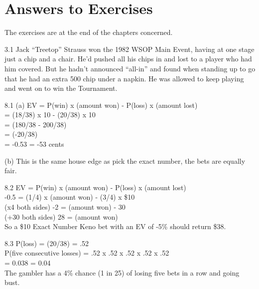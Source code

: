 \chapter{Answers to Exercises}

The exercises are at the end of the chapters concerned.

3.1 Jack ``Treetop'' Strauss won the 1982 WSOP Main Event,
having at one stage just a chip and a chair. He'd
pushed all his chips in and lost to a player who had him
covered. But he hadn't announced ``all-in'' and found when standing up
to go that he had an extra 500 chip under a napkin. He was allowed to
keep playing and went on to win the Tournament.

8.1 (a) EV = P(win) x (amount won) - P(loss) x (amount lost) \\
= (18/38) x 10 - (20/38) x 10 \\
= (180/38 - 200/38) \\
= (-20/38) \\
= -0.53 = -53 cents

(b) This is the same house edge as pick the exact number, the bets are
equally fair.

8.2 EV = P(win) x (amount won) - P(loss) x (amount lost) \\
-0.5  = (1/4)  x (amount won) - (3/4) x \$10 \\
(x4 both sides) -2 = (amount won) - 30 \\
(+30 both sides) 28 = (amount won) \\

So a \$10 Exact Number Keno bet with an EV of -5\% should return
\$38.

8.3 P(loss) = (20/38) = .52 \\
P(five consecutive losses)  = .52 x .52 x .52 x .52 x .52 \\
= 0.038 = 0.04 \\

The gambler has a 4\% chance (1 in 25) of losing five bets in a row
and going bust.

